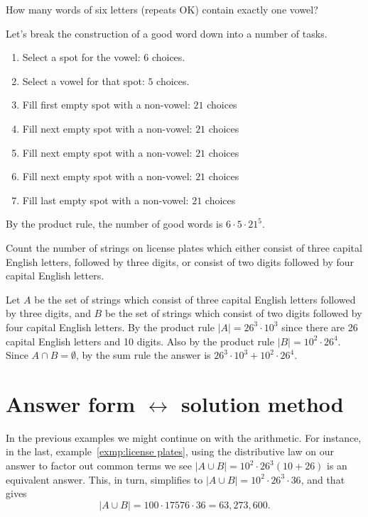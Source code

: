 \begin{exmp}
 How many words of six letters (repeats OK) contain exactly
 one vowel?
 \begin{soln}
  Let's break the construction of a good word down into a number of tasks. \begin{enumerate}[label=Task \arabic*:, itemindent=1cm]
    \item Select a spot for the vowel: $6$ choices.
     
     \item Select a vowel for that spot: $5$ choices.
     
     \item Fill first empty spot with a non-vowel: $21$ choices
     
     \item Fill next empty spot with a non-vowel: $21$ choices
     
     \item Fill next empty spot with a non-vowel: $21$ choices
     
     \item Fill next empty spot with a non-vowel: $21$ choices
     
     \item Fill last empty spot with a non-vowel: $21$ choices
   \end{enumerate}
   By the product rule, the number of good words is $6\cdot5\cdot21^5$.
 \end{soln}
 
\end{exmp}

\begin{exmp}\label{exmp:license plates}
Count the number of strings on license plates which either 
consist of three capital English letters, followed by three digits, or consist of two digits
followed by four capital English letters.
\begin{soln}
Let $A$ be the set of strings which consist of three capital English letters
followed by three digits, and $B$ be the set of strings which consist of two digits followed
by four capital English letters. By the product rule $\lvert A \rvert=26^3\cdot 10^3$ since
there are 26 capital English letters and 10 digits. Also by the product rule
$\lvert B \rvert=10^2\cdot 26^4$. Since $A\cap B=\emptyset$, by the sum rule
the answer is $26^3\cdot 10^3 + 10^2\cdot 26^4$.
\end{soln}
\end{exmp}


\section{Answer form $\longleftrightarrow$ solution method}
In the previous examples we might continue on with the arithmetic. For instance, in
the last, example~\ref{exmp:license plates},
using the distributive law on our answer to factor out common terms
we see $\lvert A\cup B \rvert=10^2\cdot 26^3(10+26)$
is an equivalent answer.
This, in turn, simplifies to $\vert A\cup B \rvert=10^2\cdot 26^3\cdot 36$, and that gives 
\[
\lvert A\cup B \rvert=100\cdot17576\cdot 36=63,273,600.
\]


